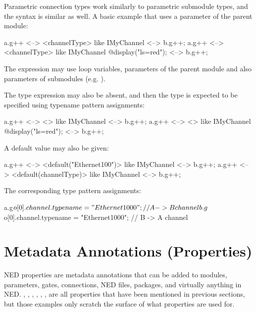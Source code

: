Parametric connection types work similarly to parametric submodule types,
and the syntax is similar as well. A basic example that uses a parameter of
the parent module:

\begin{ned}
a.g++ <--> <channelType> like IMyChannel <--> b.g++;
a.g++ <--> <channelType> like IMyChannel {@display("ls=red");} <--> b.g++;
\end{ned}

The expression may use loop variables, parameters of the parent module
and also parameters of submodules (e.g. ).

The type expression may also be absent, and then the type is expected to be
specified using typename pattern assignments:

\begin{ned}
a.g++ <--> <> like IMyChannel <--> b.g++;
a.g++ <--> <> like IMyChannel {@display("ls=red");} <--> b.g++;
\end{ned}

A default value may also be given:

\begin{ned}
a.g++ <--> <default("Ethernet100")> like IMyChannel <--> b.g++;
a.g++ <--> <default(channelType)> like IMyChannel <--> b.g++;
\end{ned}

The corresponding type pattern assignments:

\begin{ned}
a.g$o[0].channel.typename = "Ethernet1000";  // A -> B channel
b.g$o[0].channel.typename = "Ethernet1000";  // B -> A channel
\end{ned}


\section{Metadata Annotations (Properties)}
\label{sec:ned-lang:properties}

NED properties are metadata annotations that can be added to modules, parameters,
gates, connections, NED files, packages, and virtually anything in NED.
, , , , ,
,  are all properties that have been mentioned in
previous sections, but those examples only scratch the surface of what
properties are used for.


